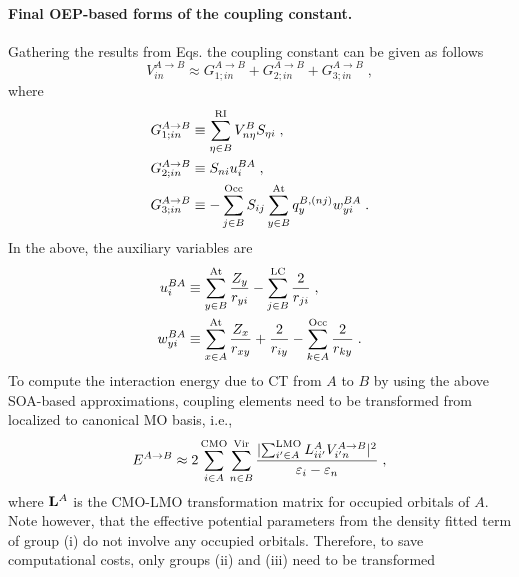 \paragraph{Final OEP-based forms of the coupling constant.}
Gathering the results from Eqs. the coupling constant
can be given as follows
%
\begin{equation} \label{e:ct-murell-etal.vin.oep}
V_{in}^{A\rightarrow B} 
       \approx 
 G_{1;in}^{A\rightarrow B} 
+G_{2;in}^{A\rightarrow B} 
+G_{3;in}^{A\rightarrow B} \;,
\end{equation}
%
where
%
\begin{subequations}
\begin{align}
 G_{1;in}^{A\rightarrow B} &\equiv \sum_{\eta\in B}^{\rm RI} V^B_{n\eta} S_{\eta i} \;, \\
 G_{2;in}^{A\rightarrow B} &\equiv S_{ni} u_i^{BA} \;, \\
 G_{3;in}^{A\rightarrow B} &\equiv
 -\sum_{j   \in B}^{\rm Occ} S_{ij}
  \sum_{y   \in B}^{\rm At} q_y^{B,(nj)} w_{yi}^{BA}
\;.
\end{align}
\end{subequations}
%
In the above, the auxiliary variables are
%
\begin{subequations}
\begin{align} \label{e:ct-murell-etal.vin.oep.aux-var}
 u_i^{BA} &\equiv    
 \sum_{y\in B}^{\rm At}
  \frac{Z_y}{ r_{yi} } 
 -
 \sum_{j\in B}^{\rm LC}
  \frac{2}{r_{ji}} 
                \;, \\
 w_{yi}^{BA} &\equiv 
   \sum_{x\in A}^{\rm At}
   \frac{Z_x}{r_{xy}}
  + \frac{2}{r_{iy}}
  - \sum_{k\in A}^{\rm Occ}
    \frac{2}{r_{ky}} 
                \;.
\end{align}
\end{subequations}
%
To compute the interaction energy due to CT from $A$ to $B$ by using the above SOA\hyp{}based
approximations, coupling elements need to be transformed from localized to canonical MO basis, i.e.,
%
\begin{equation} \label{e:ect-oep.prefinal}
 E^{A\rightarrow B} \approx 
 2 
 \sum_{i\in A}^{\rm CMO}
 \sum_{n\in B}^{\rm Vir}
 \frac{
 \lvert
   \sum_{i'\in A}^{\rm LMO} L_{ii'}^A
   V_{i'n}^{A\rightarrow B}
 \rvert^2 }{\varepsilon_i - \varepsilon_n} \;,
\end{equation}
%
where ${\bf L}^A$ is the CMO\hyp{}LMO transformation matrix for occupied orbitals of $A$. 
Note however, that the effective potential parameters from the density fitted term of group (i) 
do not involve any occupied orbitals.
Therefore, to save computational costs, only groups (ii) and (iii) need to be transformed
